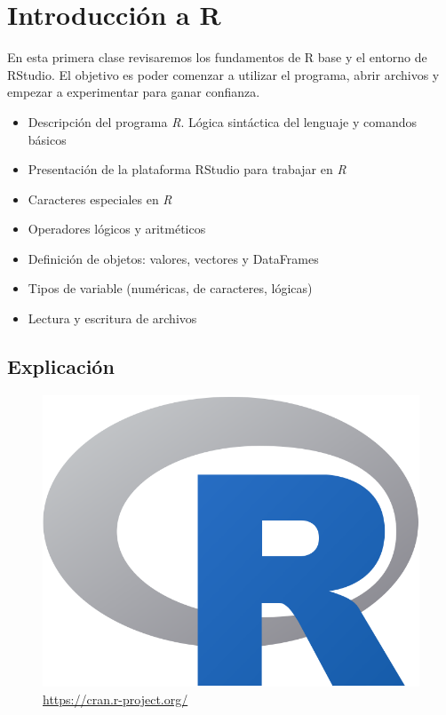 \documentclass[]{book}
\providecommand{\tightlist}{%
  \setlength{\itemsep}{0pt}\setlength{\parskip}{0pt}}
\begin{document}
\hypertarget{introduccion-a-r}{%
\chapter{Introducción a R}\label{introduccion-a-r}}

En esta primera clase revisaremos los fundamentos de R base y el entorno de RStudio. El objetivo es poder comenzar a utilizar el programa, abrir archivos y empezar a experimentar para ganar confianza.

\begin{itemize}
\tightlist
\item
  Descripción del programa \emph{R}. Lógica sintáctica del lenguaje y comandos básicos
\item
  Presentación de la plataforma RStudio para trabajar en \emph{R}
\item
  Caracteres especiales en \emph{R}
\item
  Operadores lógicos y aritméticos
\item
  Definición de objetos: valores, vectores y DataFrames
\item
  Tipos de variable (numéricas, de caracteres, lógicas)
\item
  Lectura y escritura de archivos
\end{itemize}

\hypertarget{explicacion}{%
\section{Explicación}\label{explicacion}}

\begin{figure}
\centering
\includegraphics[width=10.41667in,height=\textheight]{img/Rlogo.png}
\caption{\url{https://cran.r-project.org/}}
\end{figure}
\end{document}
